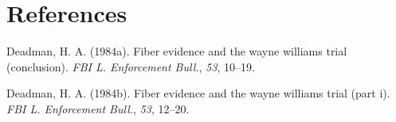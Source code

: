 \documentclass[
  10pt,
  dvipsnames,enabledeprecatedfontcommands]{scrartcl}
\newlength{\cslhangindent}
\newlength{\cslentryspacingunit} %
\newenvironment{CSLReferences}[2] %
 {%
  \setlength{\parindent}{0pt}
  \ifodd #1
  \let\oldpar\par
  \def\par{\hangindent=\cslhangindent\oldpar}
  \fi
  \setlength{\parskip}{#2\cslentryspacingunit}
 }%
 {}
\begin{document}
\hypertarget{references}{%
\section*{References}\label{references}}

\hypertarget{refs}{}
\begin{CSLReferences}{1}{0}
\leavevmode{}%
Deadman, H. A. (1984a). Fiber evidence and the wayne williams trial
(conclusion). \emph{FBI L. Enforcement Bull.}, \emph{53}, 10--19.

\leavevmode{}%
Deadman, H. A. (1984b). Fiber evidence and the wayne williams trial
(part i). \emph{FBI L. Enforcement Bull.}, \emph{53}, 12--20.

\end{CSLReferences}
\end{document}
